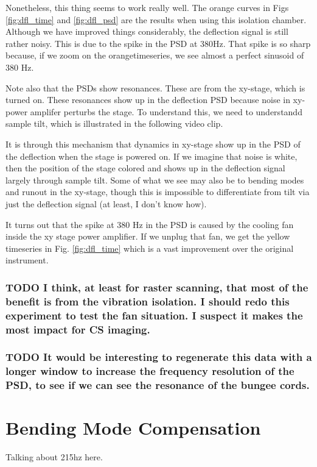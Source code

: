 \documentclass[11pt]{article}
\begin{document}
Nonetheless, this thing seems to work really well. The orange curves in Figs \ref{fig:dfl_time} and \ref{fig:dfl_psd} are the results when using this isolation chamber. Although we have improved things considerably, the deflection signal is still rather noisy. This is due to the spike in the PSD at 380Hz. That spike is so sharp because, if we zoom on the orangetimeseries, we see almost a perfect sinusoid of 380 Hz.

Note also that the PSDs show resonances. These are from the xy-stage, which is turned on. These resonances show up in the deflection PSD because noise in xy-power amplifer perturbs the stage. To understand this, we need to understandd sample tilt, which is illustrated in the following video clip.

It is through this mechanism that dynamics in xy-stage show up in the PSD of the deflection when the stage is powered on.
If we imagine that noise is white, then the position of the stage colored and shows up in the deflection signal largely through sample tilt. Some of what we see may also be to bending modes and runout in the xy-stage, though this is impossible to differentiate from tilt via just the deflection signal (at least, I don't know how). 

It turns out that the spike at 380 Hz in the PSD is caused by the cooling fan inside the xy stage power amplifier. If we unplug that fan, we get the yellow timeseries in Fig. \ref{fig:dfl_time}  which is a vast improvement over the original instrument. 

\subsubsection{{\bfseries\sffamily TODO} I think, at least for raster scanning, that most of the benefit is from the vibration isolation. I should redo this experiment to test the fan situation. I suspect it makes the most impact for CS imaging.}
\label{sec:org7a9f0ba}
\subsubsection{{\bfseries\sffamily TODO} It would be interesting to regenerate this data with a longer window to increase the frequency resolution of the PSD, to see if we can see the resonance of the bungee cords.}
\label{sec:org499bc13}
\section{Bending Mode Compensation \label{sec:z_comp}}
\label{sec:org5ae99bb}
Talking about 215hz here.
\end{document}
